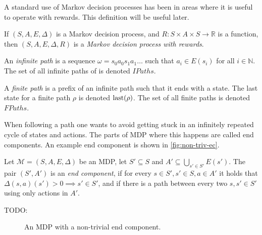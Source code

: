 A standard use of Markov decision processes has been in areas where it
is useful to operate with rewards. This definition will be useful later.

\begin{definition}
If $(S, A, E, \Delta)$ is a Markov decision process,
and $R : S \times A \times S \to \mathbb{R}$ is a function,
then $(S,A,E,\Delta,R)$ is a {\em Markov decision process with rewards}.
\end{definition}


\begin{definition}[Path]
    An {\em infinite path} is
    a sequence $\omega = s_0 a_0 s_1 a_1
    \ldots$ such that $a_i \in E(s_i)$ for all $i \in \mathbb{N}$.
    The set of all infinite paths of is denoted $IPaths$.

    A {\em finite path} is a prefix of an infinite path such that it
    ends with a state. The last state for a finite path $\rho$ is
    denoted $\operatorname{last}(\rho)$. The set of all finite paths is denoted
    $FPaths$.
\end{definition}

When following a path one wants to avoid getting stuck in
an infinitely repeated cycle of states and actions. The parts of MDP
where this happens are called end components.
An example end component is shown in \autoref{fig:non-triv-ec}.

\begin{definition}
Let $\mathcal{M} = (S, A, E, \Delta)$ be an MDP,
let $S' \subseteq S$ and $A' \subseteq \bigcup_{s' \in S'} E(s')$.
The pair $(S', A')$ is an {\em end component},
if for every $s \in S', s' \in S, a \in A'$ it holds that
$\Delta(s,a)(s') > 0 \implies s' \in S'$,
and if there is a path between every two $s, s' \in S'$
using only actions in $A'$.
\end{definition}

TODO:

\begin{figure}[ht]
\begin{center}
\end{center}
\caption{An MDP with a non-trivial end component.}
\label{fig:non-triv-ec}
\end{figure}


